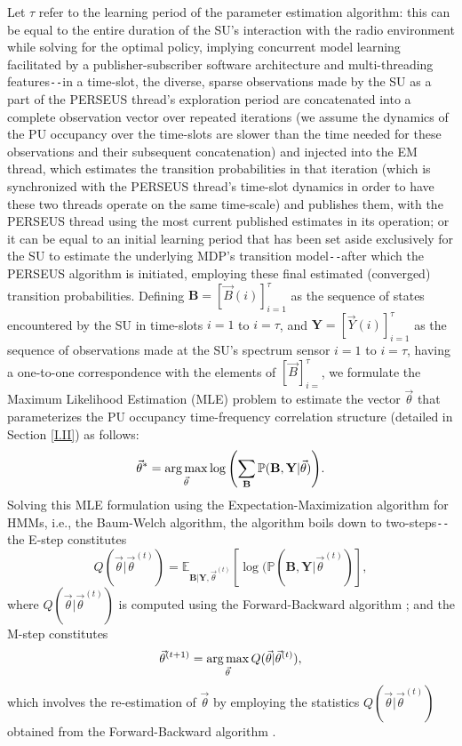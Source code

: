 Let $\tau$ refer to the learning period of the parameter estimation algorithm: this can be equal to the entire duration of the SU's interaction with the radio environment while solving for the optimal policy, implying concurrent model learning facilitated by a publisher-subscriber software architecture and multi-threading features\texttt{-{}-}in a time-slot, the diverse, sparse observations made by the SU as a part of the PERSEUS thread's exploration period are concatenated into a complete observation vector over repeated iterations (we assume the dynamics of the PU occupancy over the time-slots are slower than the time needed for these observations and their subsequent concatenation) and injected into the EM thread, which estimates the transition probabilities in that iteration (which is synchronized with the PERSEUS thread's time-slot dynamics in order to have these two threads operate on the same time-scale) and publishes them, with the PERSEUS thread using the most current published estimates in its operation; or it can  be equal to an initial learning period that has been set aside exclusively for the SU to estimate the underlying MDP's transition model\texttt{-{}-}after which the PERSEUS algorithm is initiated, employing these final estimated (converged) transition probabilities. Defining $\mathbf{B}{=}[\vec{B}(i)]_{i{=}1}^{\tau}$ as the sequence of states encountered by the SU in time-slots $i{=}1$ to $i{=}\tau$, and $\mathbf{Y}{=}[\vec{Y}(i)]_{i{=}1}^{\tau}$ as the sequence of observations made at the SU's spectrum sensor $i{=}1$ to $i{=}\tau$, having a one-to-one correspondence with the elements of $[\vec{B}]_{i{=}}^{\tau}$, we formulate the Maximum Likelihood Estimation (MLE) problem to estimate the vector $\vec{\theta}$ that parameterizes the PU occupancy time-frequency correlation structure (detailed in Section \ref{I.II}) as follows:
\begin{equation}\label{19}
    \vec{\theta}^{*}=\operatorname*{arg\,max}_{\vec{\theta}}\log{\left(\sum_{\mathbf{B}}\mathbb{P}(\mathbf{B},\mathbf{Y}|\vec{\theta})\right)}.
\end{equation}
Solving this MLE formulation using the Expectation-Maximization algorithm \cite{WCL:14} for HMMs, i.e., the Baum-Welch algorithm, the algorithm boils down to two-steps\texttt{-{}-}the E-step constitutes
\begin{equation}\label{20}
    Q(\vec{\theta}|\vec{\theta}^{(t)})=\mathbb{E}_{\mathbf{B}|\mathbf{Y},\vec{\theta}^{(t)}}\left[\log{(\mathbb{P}(\mathbf{B},\mathbf{Y}|\vec{\theta}^{(t)})}\right],
\end{equation}
where $Q(\vec{\theta}|\vec{\theta}^{(t)})$ is computed using the Forward-Backward algorithm \cite{WCL:14}; and the M-step constitutes
\begin{equation}\label{21}
    \vec{\theta}^{(t+1)}=\operatorname*{arg\,max}_{\vec{\theta}}Q(\vec{\theta}|\vec{\theta}^{(t)}),
\end{equation}
which involves the re-estimation of $\vec{\theta}$ by employing the statistics $Q(\vec{\theta}|\vec{\theta}^{(t)})$ obtained from the Forward-Backward algorithm \cite{WCL:paper}.
